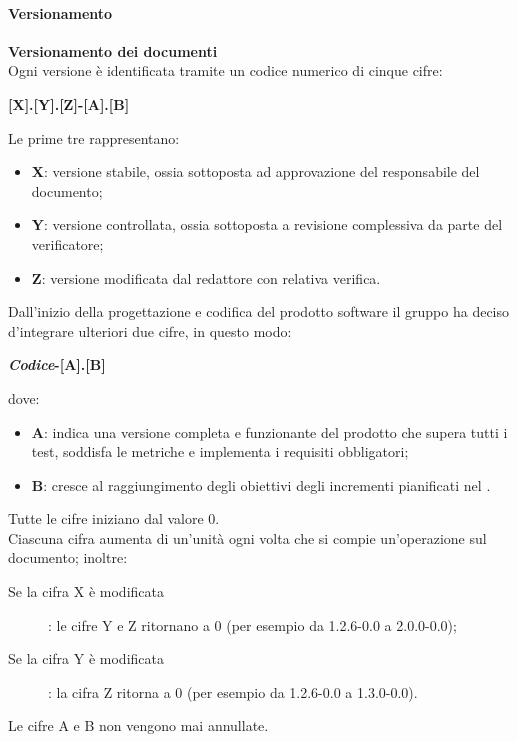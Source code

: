 \paragraph{Versionamento}
\textbf{Versionamento dei documenti}\\
Ogni versione è identificata tramite un codice numerico di cinque cifre:
\begin{center}
\textbf{[X].[Y].[Z]-[A].[B]} 
\end{center}
Le prime tre rappresentano:
\begin{itemize}
	\item \textbf{X}: versione stabile, ossia sottoposta ad approvazione del responsabile del documento;
  	\item \textbf{Y}: versione controllata, ossia sottoposta a revisione complessiva da parte del verificatore;
  	\item \textbf{Z}: versione modificata dal redattore con relativa verifica.
\end{itemize}
  
Dall'inizio della progettazione e codifica del prodotto software il gruppo ha deciso d'integrare ulteriori due cifre, in questo  modo:
\begin{center}
\textbf{\textit{Codice}-[A].[B]} 
\end{center}
dove: 
\begin{itemize}
	\item \textbf{A}: indica una versione completa e funzionante del prodotto che supera tutti i test, soddisfa le metriche e implementa i requisiti obbligatori;
	\item \textbf{B}: cresce al raggiungimento degli obiettivi degli incrementi pianificati nel . 
\end{itemize}

Tutte le cifre iniziano dal valore 0. \\ 
Ciascuna cifra aumenta di un'unità ogni volta che si compie un'operazione sul documento; inoltre:
\begin{description}
	\item[Se la cifra X è modificata] : le cifre Y e Z ritornano a 0 (per esempio da 1.2.6-0.0 a 2.0.0-0.0);
	\item[Se la cifra Y è modificata] : la cifra Z ritorna a 0 (per esempio da 1.2.6-0.0 a 1.3.0-0.0).
\end{description}
Le cifre A e B non vengono mai annullate.\\ \mbox{}

